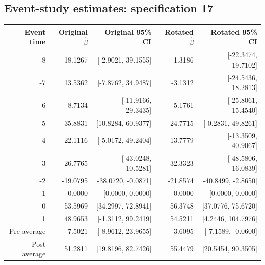 \documentclass[10pt]{article}
\begin{document}
\subsection*{Event-study estimates: specification 17}
\begin{center}\scriptsize
\begin{tabular}{r rr rr}
\toprule
Event time & Original $\hat\beta$ & Original 95\% CI & Rotated $\hat\beta$ & Rotated 95\% CI \\
\midrule
-8 & 18.1267 & [-2.9021, 39.1555] & -1.3186 & [-22.3474, 19.7102] \\
-7 & 13.5362 & [-7.8762, 34.9487] & -3.1312 & [-24.5436, 18.2813] \\
-6 & 8.7134 & [-11.9166, 29.3435] & -5.1761 & [-25.8061, 15.4540] \\
-5 & 35.8831 & [10.8284, 60.9377] & 24.7715 & [-0.2831, 49.8261] \\
-4 & 22.1116 & [-5.0172, 49.2404] & 13.7779 & [-13.3509, 40.9067] \\
-3 & -26.7765 & [-43.0248, -10.5281] & -32.3323 & [-48.5806, -16.0839] \\
-2 & -19.0795 & [-38.0720, -0.0871] & -21.8574 & [-40.8499, -2.8650] \\
-1 & 0.0000 & [0.0000, 0.0000] & 0.0000 & [0.0000, 0.0000] \\
0 & 53.5969 & [34.2997, 72.8941] & 56.3748 & [37.0776, 75.6720] \\
1 & 48.9653 & [-1.3112, 99.2419] & 54.5211 & [4.2446, 104.7976] \\
\midrule
Pre average & 7.5021 & [-8.9612, 23.9655] & -3.6095 & [-7.1589, -0.0600] \\
Post average & 51.2811 & [19.8196, 82.7426] & 55.4479 & [20.5454, 90.3505] \\
\bottomrule
\end{tabular}
\end{center}
\clearpage
\end{document}
